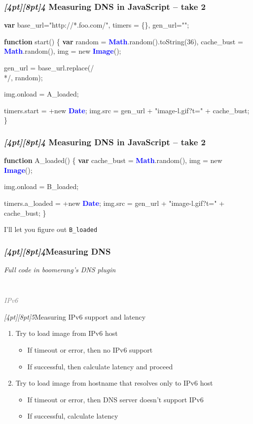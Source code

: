 \documentclass{beamer}
\newcommand{\sn}[1]{\textrm{\textit{\Huge{\raisebox{-3pt}[4pt][8pt]{\textcolor{f2elblue}{#1}}}}}\hspace{4pt}}
\newcommand{\innersplash}[1]{
  \begin{center}
    \large \textrm{\textit{ #1 } }
  \end{center}
}
\newcommand{\splashslide}[2][{}]{
  \begin{frame}
  \frametitle{#1}
  \innersplash{#2}
  \end{frame}
}
\newcommand{\leadinslide}[2]{
  \splashslide{
     {\fontsize{150}{20}\selectfont{\raisebox{0pt}[90pt][0pt]{\textcolor{light-gray}{#1}}}} \\ \huge \textcolor{gray}{#2}
  }
}
\def\green<#1>#2{\textcolor<#1>{dark-green}{\textbf<#1>{#2}}}
\def\blue<#1>#2{\textcolor<#1>{blue}{\textbf<#1>{#2}}}
\begin{document}
\begin{frame}[fragile]
\frametitle{\sn{4} Measuring DNS in JavaScript -- take 2}
\begin{semiverbatim}
\green<1>{var} base\_url="http://*.foo.com/",
    timers = \{\}, gen\_url="";

\green<1>{function} start() \{
  \green<1>{var} random = \blue<1>{Math}.random().toString(36),
      cache\_bust = \blue<1>{Math}.random(),
      img = new \blue<1>{Image}();

  gen\_url = base\_url.replace(/\\*/, random);

  img.onload = A\_loaded;

  timers.start = +new \blue<1>{Date};
  img.src = gen\_url + "image-l.gif?t=" + cache\_bust;
\}
\end{semiverbatim}
\end{frame}

\begin{frame}[fragile]
\frametitle{\sn{4} Measuring DNS in JavaScript -- take 2}
\begin{semiverbatim}
\green<1>{function} A\_loaded() \{
  \green<1>{var} cache\_bust = \blue<1>{Math}.random(),
      img = new \blue<1>{Image}();

  img.onload = B\_loaded;

  timers.a\_loaded = +new \blue<1>{Date};
  img.src = gen\_url + "image-l.gif?t=" + cache\_bust;
\}
\end{semiverbatim}

\vspace{1.2em}
I'll let you figure out \texttt{B\_loaded}
\end{frame}

\splashslide[\sn{4}Measuring DNS]{ Full code in boomerang's DNS plugin }

\leadinslide{5}{IPv6}

\begin{frame}{\sn{5}Measuring IPv6 support and latency}
\begin{enumerate}
  \item Try to load image from IPv6 host
  \begin{itemize}
    \item If timeout or error, then no IPv6 support
    \item If successful, then calculate latency and proceed
  \end{itemize}
  \item Try to load image from hostname that resolves only to IPv6 host
  \begin{itemize}
    \item If timeout or error, then DNS server doesn't support IPv6
    \item If successful, calculate latency
  \end{itemize}
\end{enumerate}
\end{frame}
\end{document}
